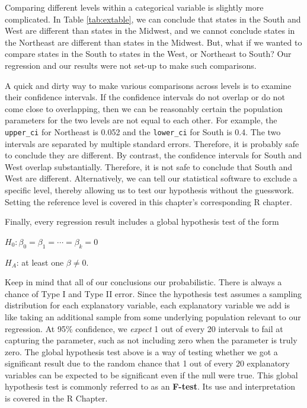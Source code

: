 \documentclass[
]{book}
\begin{document}
Comparing different levels within a categorical variable is slightly more complicated. In Table \ref{tab:extable}, we can conclude that states in the South and West are different than states in the Midwest, and we cannot conclude states in the Northeast are different than states in the Midwest. But, what if we wanted to compare states in the South to states in the West, or Northeast to South? Our regression and our results were not set-up to make such comparisons.

A quick and dirty way to make various comparisons across levels is to examine their confidence intervals. If the confidence intervals do not overlap or do not come close to overlapping, then we can be reasonably certain the population parameters for the two levels are not equal to each other. For example, the \texttt{upper\_ci} for Northeast is 0.052 and the \texttt{lower\_ci} for South is 0.4. The two intervals are separated by multiple standard errors. Therefore, it is probably safe to conclude they are different. By contrast, the confidence intervals for South and West overlap substantially. Therefore, it is not safe to conclude that South and West are different. Alternatively, we can tell our statistical software to exclude a specific level, thereby allowing us to test our hypothesis without the guesswork. Setting the reference level is covered in this chapter's corresponding R chapter.

Finally, every regression result includes a global hypothesis test of the form

\(H_0: \beta_0 = \beta_1 = \cdots = \beta_k = 0\)

\(H_A\): at least one \(\beta \neq 0\).

Keep in mind that all of our conclusions our probabilistic. There is always a chance of Type I and Type II error. Since the hypothesis test assumes a sampling distribution for each explanatory variable, each explanatory variable we add is like taking an additional sample from some underlying population relevant to our regression. At 95\% confidence, we \emph{expect} 1 out of every 20 intervals to fail at capturing the parameter, such as not including zero when the parameter is truly zero. The global hypothesis test above is a way of testing whether we got a significant result due to the random chance that 1 out of every 20 explanatory variables can be expected to be significant even if the null were true. This global hypothesis test is commonly referred to as an \textbf{F-test}. Its use and interpretation is covered in the R Chapter.
\end{document}

